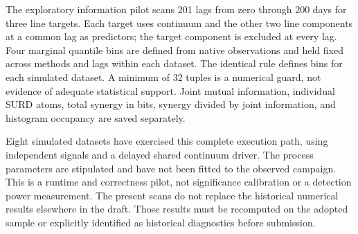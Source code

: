 The exploratory information pilot scans 201 lags from zero through 200 days for three line targets. Each target uses continuum and the other two line components at a common lag as predictors; the target component is excluded at every lag. Four marginal quantile bins are defined from native observations and held fixed across methods and lags within each dataset. The identical rule defines bins for each simulated dataset. A minimum of 32 tuples is a numerical guard, not evidence of adequate statistical support. Joint mutual information, individual SURD atoms, total synergy in bits, synergy divided by joint information, and histogram occupancy are saved separately.

Eight simulated datasets have exercised this complete execution path, using independent signals and a delayed shared continuum driver. The process parameters are stipulated and have not been fitted to the observed campaign. This is a runtime and correctness pilot, not significance calibration or a detection power measurement. The present scans do not replace the historical numerical results elsewhere in the draft. Those results must be recomputed on the adopted sample or explicitly identified as historical diagnostics before submission.
